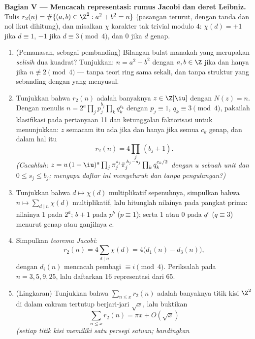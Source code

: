 \begin{problem}
\medskip
\noindent\textbf{Bagian V --- Mencacah representasi: rumus Jacobi
dan deret Leibniz.} Tulis $r_2(n) = \#\{(a, b) \in
\Z^2 : a^2 + b^2 = n\}$ (pasangan terurut, dengan tanda dan nol ikut
dihitung), dan misalkan $\chi$ karakter tak trivial modulo $4$:
$\chi(d) = +1$ jika $d \equiv 1$, $-1$ jika $d \equiv 3 \pmod4$,
dan $0$ jika $d$ genap.
\begin{enumerate}[resume]
  \item (Pemanasan, sebagai pembanding) Bilangan bulat manakah yang merupakan
        \emph{selisih} dua kuadrat? Tunjukkan: $n = a^2 - b^2$
        dengan $a, b \in \Z$ jika dan hanya jika $n \not\equiv 2 \pmod 4$ ---
        tanpa teori ring sama sekali, dan tanpa struktur yang sebanding dengan
        yang menyusul.
  \item Tunjukkan bahwa $r_2(n)$ adalah banyaknya $z \in \Z[\iu]$ dengan
        $N(z) = n$. Dengan menulis $n = 2^{a}\prod_jp_j^{b_j}
        \prod_kq_k^{c_k}$ dengan $p_j \equiv 1$, $q_k \equiv 3
        \pmod4$, pakailah klasifikasi pada pertanyaan 11 dan
        ketunggalan faktorisasi untuk menunjukkan: $z$ semacam itu ada jika dan hanya jika semua
        $c_k$ genap, dan dalam hal itu
        \[
        r_2(n) = 4\prod_j\,(b_j + 1) .
        \]
        \emph{(Cacahlah: $z = u\,(1+\iu)^{a}\prod_j\pi_j^{s_j}
        \bar\pi_j^{\,b_j - s_j}\prod_kq_k^{c_k/2}$ dengan $u$ sebuah
        unit dan $0 \leq s_j \leq b_j$; mengapa daftar ini
        menyeluruh dan tanpa pengulangan?)}
  \item Tunjukkan bahwa $d \mapsto \chi(d)$ multiplikatif
        sepenuhnya, simpulkan bahwa $n \mapsto
        \sum_{d \mid n}\chi(d)$ multiplikatif, lalu hitunglah nilainya
        pada pangkat prima: nilainya $1$ pada $2^a$; $b + 1$ pada
        $p^b$ ($p \equiv 1$); serta $1$ atau $0$ pada $q^c$ ($q \equiv 3$)
        menurut genap atau ganjilnya $c$.
  \item Simpulkan \emph{teorema Jacobi}:
        \[
        r_2(n) = 4\sum_{d \mid n}\chi(d) =
        4\bigl(d_1(n) - d_3(n)\bigr),
        \]
        dengan $d_i(n)$ mencacah pembagi $\equiv i \pmod 4$.
        Periksalah pada $n = 3, 5, 9, 25$, lalu daftarkan $16$
        representasi dari $65$.
  \item (Lingkaran) Tunjukkan bahwa $\sum_{n \leq x}r_2(n)$ adalah
        banyaknya titik kisi $\Z^2$ di dalam cakram tertutup
        berjari-jari $\sqrt x$, lalu buktikan
        \[
        \sum_{n\leq x}r_2(n) = \pi x + O(\sqrt x)
        \]
        \emph{(setiap titik kisi memiliki satu persegi satuan; bandingkan
}
\end{enumerate}
\end{problem}
